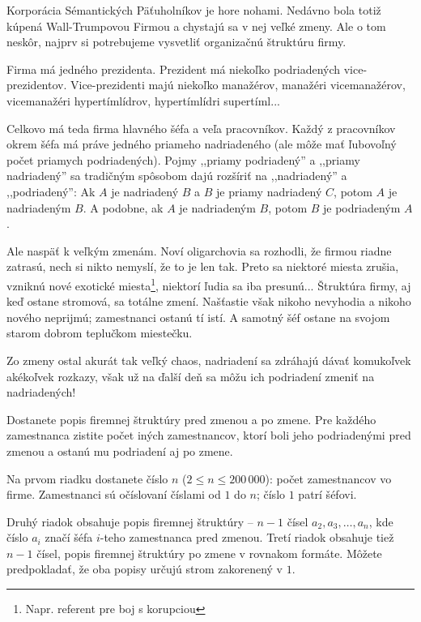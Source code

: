 
\usepackage[slovak]{babel}




Korporácia Sémantických Päťuholníkov je hore nohami. Nedávno bola totiž
kúpená Wall-Trumpovou Firmou a chystajú sa v nej veľké zmeny. Ale o tom neskôr,
najprv si potrebujeme vysvetliť organizačnú štruktúru firmy.

Firma má jedného prezidenta. Prezident má niekoľko podriadených vice-prezidentov.
Vice-prezidenti majú niekoľko manažérov, manažéri vicemanažérov, vicemanažéri
hypertímlídrov, hypertímlídri supertíml...

Celkovo má teda firma hlavného šéfa a veľa pracovníkov. Každý z pracovníkov okrem šéfa
má práve jedného priameho nadriadeného (ale môže mať ľubovoľný počet priamych 
podriadených). Pojmy ,,priamy podriadený'' a ,,priamy nadriadený'' sa tradičným spôsobom
dajú rozšíriť na ,,nadriadený'' a ,,podriadený'': Ak $A$ je nadriadený $B$ a $B$
je priamy nadriadený $C$, potom $A$
je nadriadeným $B$. A podobne, ak $A$ je nadriadeným $B$, potom $B$ je podriadeným $A$.

Ale naspäť k veľkým zmenám. Noví oligarchovia sa rozhodli, že firmou riadne zatrasú,
nech si nikto nemyslí, že to je len tak. Preto sa niektoré miesta zrušia,
vzniknú nové exotické miesta\footnote{Napr. referent pre boj s korupciou}, niektorí ľudia sa iba
presunú... Štruktúra firmy, aj keď ostane stromová, sa totálne
zmení. Našťastie však nikoho nevyhodia a nikoho nového neprijmú; zamestnanci ostanú
tí istí. A samotný šéf ostane na svojom starom dobrom teplučkom miestečku.

Zo zmeny ostal akurát tak veľký chaos, nadriadení sa zdráhajú dávať komukoľvek
akékoľvek rozkazy, však už na ďalší deň sa môžu ich podriadení zmeniť na
nadriadených!


Dostanete popis firemnej štruktúry pred zmenou a po zmene. Pre každého zamestnanca
zistite počet iných zamestnancov, ktorí boli jeho podriadenými pred zmenou a ostanú
mu podriadení aj po zmene.


Na prvom riadku dostanete číslo $n$ ($2 \leq n \leq 200\,000$): počet zamestnancov vo firme.
Zamestnanci sú očíslovaní číslami od $1$ do $n$; číslo $1$ patrí šéfovi.

Druhý riadok obsahuje popis firemnej štruktúry -- $n-1$ čísel $a_2, a_3, \ldots, a_n$, kde
číslo $a_i$ značí šéfa $i$-teho zamestnanca pred zmenou. Tretí riadok obsahuje tiež $n-1$
čísel, popis firemnej štruktúry po zmene v rovnakom formáte. Môžete predpokladať, že oba
popisy určujú strom zakorenený v $1$.

